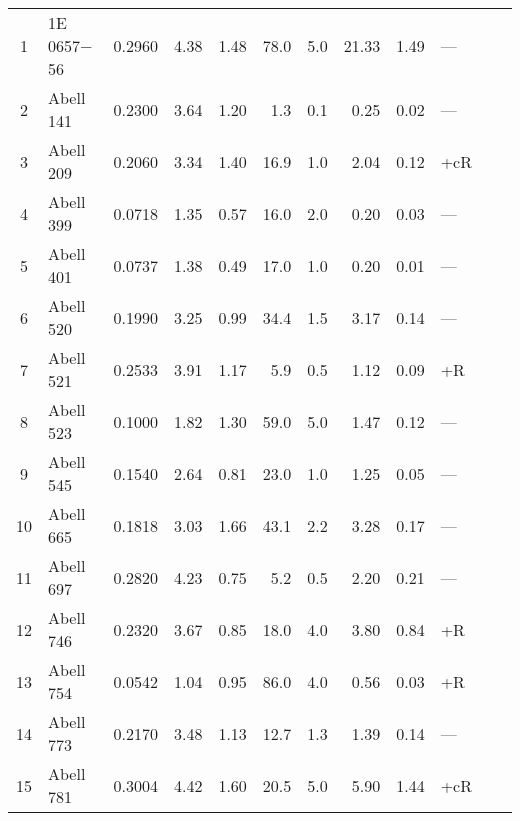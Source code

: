 \begin{ThreePartTable}
\begin{longtable}{clcccr@{$\,\pm\,$}lr@{$\,\pm\,$}llll}
 1 & 1E 0657$-$56          & 0.2960 & 4.38 & 1.48 &  78.0 &  5.0          & 21.33 &  1.49 & --- & \parencite{liang2000}  \\
 2 & Abell 141             & 0.2300 & 3.64 & 1.20 &   1.3 &  0.1\tnote{a} &  0.25 &  0.02 & --- & \parencite{duchesne2017}  \\
 3 & Abell 209             & 0.2060 & 3.34 & 1.40 &  16.9 &  1.0          &  2.04 &  0.12 & +cR & \parencite{giovannini2009}  \\
 4 & Abell 399             & 0.0718 & 1.35 & 0.57 &  16.0 &  2.0          &  0.20 &  0.03 & --- & \parencite{murgia2010}  \\
 5 & Abell 401             & 0.0737 & 1.38 & 0.49 &  17.0 &  1.0          &  0.20 &  0.01 & --- & \parencite{bacchi2003}  \\
 6 & Abell 520             & 0.1990 & 3.25 & 0.99 &  34.4 &  1.5          &  3.17 &  0.14 & --- & \parencite{govoni2001}  \\
 7 & Abell 521             & 0.2533 & 3.91 & 1.17 &   5.9 &  0.5          &  1.12 &  0.09 & +R  & \parencite{giovannini2009}  \\
 8 & Abell 523             & 0.1000 & 1.82 & 1.30 &  59.0 &  5.0          &  1.47 &  0.12 & --- & \parencite{giovannini2011}  \\
 9 & Abell 545             & 0.1540 & 2.64 & 0.81 &  23.0 &  1.0          &  1.25 &  0.05 & --- & \parencite{bacchi2003}  \\
10 & Abell 665             & 0.1818 & 3.03 & 1.66 &  43.1 &  2.2          &  3.28 &  0.17 & --- & \parencite{giovannini2000}  \\
11 & Abell 697             & 0.2820 & 4.23 & 0.75 &   5.2 &  0.5          &  2.20 &  0.21 & --- & \parencite{vanWeeren2011}  \\
12 & Abell 746             & 0.2320 & 3.67 & 0.85 &  18.0 &  4.0          &  3.80 &  0.84 & +R  & \parencite{vanWeeren2011}  \\
13 & Abell 754             & 0.0542 & 1.04 & 0.95 &  86.0 &  4.0          &  0.56 &  0.03 & +R  & \parencite{bacchi2003}  \\
14 & Abell 773             & 0.2170 & 3.48 & 1.13 &  12.7 &  1.3          &  1.39 &  0.14 & --- & \parencite{govoni2001}  \\
15 & Abell 781             & 0.3004 & 4.42 & 1.60 &  20.5 &  5.0          &  5.90 &  1.44 & +cR & \parencite{govoni2011}  \\

\end{longtable}
\end{ThreePartTable}

